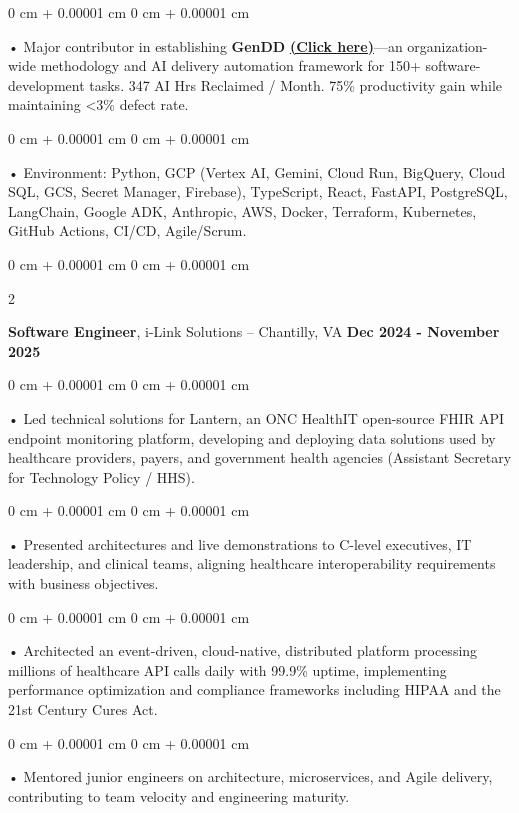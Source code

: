 \documentclass[10pt, letterpaper]{article}
\newenvironment{onecolentry}{
    \begin{adjustwidth}{
        0 cm + 0.00001 cm
    }{
        0 cm + 0.00001 cm
    }
}{
    \end{adjustwidth}
} %
\newenvironment{twocolentry}[2][]{
    \onecolentry
    \def\secondColumn{#2}
    \setcolumnwidth{\fill, 4.5 cm}
    \begin{paracol}{2}
}{
    \switchcolumn \raggedleft \secondColumn
    \end{paracol}
    \endonecolentry
} %
\begin{document}
        \begin{onecolentry}
             • Major contributor in establishing \textbf{GenDD} \href{https://hatchworks.com/generative-driven-development/}{\textbf{(Click here)}}---an organization-wide methodology and AI delivery automation framework for 150+ software-development tasks. 347 AI Hrs Reclaimed / Month. 75\% productivity gain while maintaining {<}3\% defect rate.
        \end{onecolentry}
        \begin{onecolentry}
             • Environment: Python, GCP (Vertex AI, Gemini, Cloud Run, BigQuery, Cloud SQL, GCS, Secret Manager, Firebase), TypeScript, React, FastAPI, PostgreSQL, LangChain, Google ADK, Anthropic, AWS, Docker, Terraform, Kubernetes, GitHub Actions, CI/CD, Agile/Scrum.
        \end{onecolentry}

        \vspace{0.1cm}

        \begin{twocolentry}{
            \textbf{Dec 2024 - November 2025}
        }
            \textbf{Software Engineer}, i-Link Solutions -- Chantilly, VA\end{twocolentry}


        \begin{onecolentry}
             • Led technical solutions for Lantern, an ONC HealthIT open-source FHIR API endpoint monitoring platform, developing and deploying data solutions used by healthcare providers, payers, and government health agencies (Assistant Secretary for Technology Policy / HHS).
        \end{onecolentry}
        \begin{onecolentry}
             • Presented architectures and live demonstrations to C-level executives, IT leadership, and clinical teams, aligning healthcare interoperability requirements with business objectives.
        \end{onecolentry}
        \begin{onecolentry}
             • Architected an event-driven, cloud-native, distributed platform processing millions of healthcare API calls daily with 99.9\% uptime, implementing performance optimization and compliance frameworks including HIPAA and the 21st Century Cures Act.
        \end{onecolentry}
        \begin{onecolentry}
             • Mentored junior engineers on architecture, microservices, and Agile delivery, contributing to team velocity and engineering maturity.
        \end{onecolentry}
\end{document}
